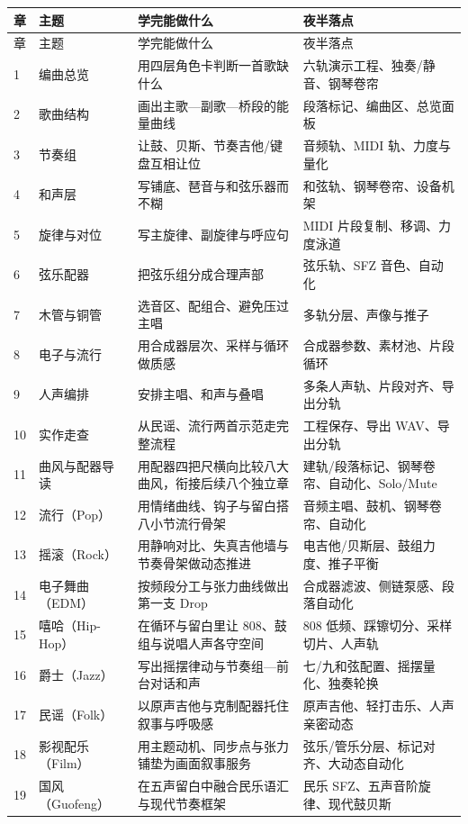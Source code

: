 \begin{longtable}{p{}p{}p{}p{}}
\toprule
章 & 主题 & 学完能做什么 & 夜半落点 \\
\midrule
\endfirsthead
\toprule
章 & 主题 & 学完能做什么 & 夜半落点 \\
\midrule
\endhead
1 & 编曲总览 & 用四层角色卡判断一首歌缺什么 & 六轨演示工程、独奏/静音、钢琴卷帘 \\
2 & 歌曲结构 & 画出主歌—副歌—桥段的能量曲线 & 段落标记、编曲区、总览面板 \\
3 & 节奏组 & 让鼓、贝斯、节奏吉他/键盘互相让位 & 音频轨、MIDI 轨、力度与量化 \\
4 & 和声层 & 写铺底、琶音与和弦乐器而不糊 & 和弦轨、钢琴卷帘、设备机架 \\
5 & 旋律与对位 & 写主旋律、副旋律与呼应句 & MIDI 片段复制、移调、力度泳道 \\
6 & 弦乐配器 & 把弦乐组分成合理声部 & 弦乐轨、SFZ 音色、自动化 \\
7 & 木管与铜管 & 选音区、配组合、避免压过主唱 & 多轨分层、声像与推子 \\
8 & 电子与流行 & 用合成器层次、采样与循环做质感 & 合成器参数、素材池、片段循环 \\
9 & 人声编排 & 安排主唱、和声与叠唱 & 多条人声轨、片段对齐、导出分轨 \\
10 & 实作走查 & 从民谣、流行两首示范走完整流程 & 工程保存、导出 WAV、导出分轨 \\
11 & 曲风与配器导读 & 用配器四把尺横向比较八大曲风，衔接后续八个独立章 & 建轨/段落标记、钢琴卷帘、自动化、Solo/Mute \\
12 & 流行（Pop） & 用情绪曲线、钩子与留白搭八小节流行骨架 & 音频主唱、鼓机、钢琴卷帘、自动化 \\
13 & 摇滚（Rock） & 用静响对比、失真吉他墙与节奏骨架做动态推进 & 电吉他/贝斯层、鼓组力度、推子平衡 \\
14 & 电子舞曲（EDM） & 按频段分工与张力曲线做出第一支 Drop & 合成器滤波、侧链泵感、段落自动化 \\
15 & 嘻哈（Hip-Hop） & 在循环与留白里让 808、鼓组与说唱人声各守空间 & 808 低频、踩镲切分、采样切片、人声轨 \\
16 & 爵士（Jazz） & 写出摇摆律动与节奏组—前台对话和声 & 七/九和弦配置、摇摆量化、独奏轮换 \\
17 & 民谣（Folk） & 以原声吉他与克制配器托住叙事与呼吸感 & 原声吉他、轻打击乐、人声亲密动态 \\
18 & 影视配乐（Film） & 用主题动机、同步点与张力铺垫为画面叙事服务 & 弦乐/管乐分层、标记对齐、大动态自动化 \\
19 & 国风（Guofeng） & 在五声留白中融合民乐语汇与现代节奏框架 & 民乐 SFZ、五声音阶旋律、现代鼓贝斯 \\
\bottomrule
\end{longtable}

